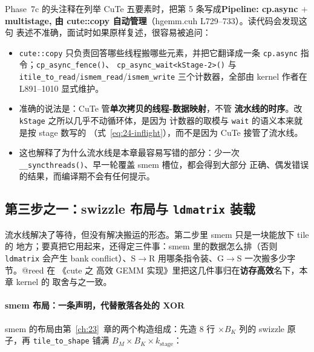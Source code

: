 Phase~7c 的头注释在列举 CuTe 五要素时，把第 5 条写成\textbf{Pipeline: cp.async $+$
multistage, 由 cute::copy 自动管理}（hgemm.cuh L729--733）。读代码会发现这句
表述不准确，面试时如果原样复述，很容易被追问：

\begin{itemize}
  \item \texttt{cute::copy} 只负责回答哪些线程搬哪些元素，并把它翻译成一条
        \texttt{cp.async} 指令；\texttt{cp\_\allowbreak{}async\_\allowbreak{}fence\allowbreak{}()}、
        \texttt{cp\_\allowbreak{}async\_\allowbreak{}wait\allowbreak{}<k\allowbreak{}Stage-2>\allowbreak{}()} 与
        \texttt{itile\_\allowbreak{}to\_\allowbreak{}read}/\texttt{ismem\_read}/\texttt{ismem\_write}
        三个计数器，全部由 kernel 作者在 L891--1010 显式维护。
  \item 准确的说法是：CuTe 管\textbf{单次拷贝的线程-数据映射}，不管
        \textbf{流水线的时序}。改 \texttt{kStage} 之所以几乎不动循环体，是因为
        计数器的取模与 \texttt{wait} 的语义本来就是按 stage 数写的
        （式~\eqref{eq:24-inflight}），而不是因为 CuTe 接管了流水线。
  \item 这也解释了为什么流水线是本章最容易写错的部分：少一次
        \texttt{\_\allowbreak{}\_\allowbreak{}syncthreads\allowbreak{}()}、早一轮覆盖 smem 槽位，都会得到大部分
        正确、偶发错误的结果，而编译期不会有任何提示。
\end{itemize}

\subsection{第三步之一：swizzle 布局与 \texttt{ldmatrix} 装载}\label{sec:24-step3a}

流水线解决了等待，但没有解决搬运的形态。第二步里 smem 只是一块能放下 tile 的
地方；要真把它用起来，还得定三件事：smem 里的数据怎么排（否则 \texttt{ldmatrix}
会产生 bank conflict）、S$\to$R 用哪条指令装、G$\to$S 一次搬多少字节。@reed 在
《cute 之 高效 GEMM 实现》里把这几件事归在\textbf{访存高效}名下，本章 kernel 的
取舍与之一致。

\paragraph{smem 布局：一条声明，代替散落各处的 XOR}

smem 的布局由第~\ref{ch:23}~章的两个构造组成：先造 8 行 $\times B_K$ 列的
swizzle 原子，再 \texttt{tile\_\allowbreak{}to\_\allowbreak{}shape} 铺满
$B_M\times B_K\times k_{\mathrm{stage}}$：

